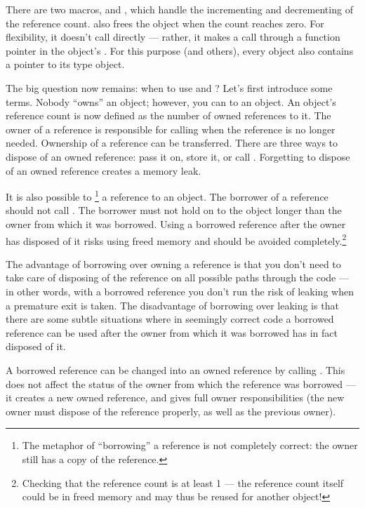 There are two macros,  and ,
which handle the incrementing and decrementing of the reference count.
 also frees the object when the count reaches zero.
For flexibility, it doesn't call  directly --- rather, it
makes a call through a function pointer in the object's .  For this purpose (and others), every object also contains a
pointer to its type object.

The big question now remains: when to use  and
?  Let's first introduce some terms.  Nobody
``owns'' an object; however, you can  to an
object.  An object's reference count is now defined as the number of
owned references to it.  The owner of a reference is responsible for
calling  when the reference is no longer
needed.  Ownership of a reference can be transferred.  There are three
ways to dispose of an owned reference: pass it on, store it, or call
.  Forgetting to dispose of an owned reference
creates a memory leak.

It is also possible to \footnote{The metaphor of
``borrowing'' a reference is not completely correct: the owner still
has a copy of the reference.} a reference to an object.  The borrower
of a reference should not call .  The borrower must
not hold on to the object longer than the owner from which it was
borrowed.  Using a borrowed reference after the owner has disposed of
it risks using freed memory and should be avoided
completely.\footnote{Checking that the reference count is at least 1
 --- the reference count itself could be in
freed memory and may thus be reused for another object!}

The advantage of borrowing over owning a reference is that you don't
need to take care of disposing of the reference on all possible paths
through the code --- in other words, with a borrowed reference you
don't run the risk of leaking when a premature exit is taken.  The
disadvantage of borrowing over leaking is that there are some subtle
situations where in seemingly correct code a borrowed reference can be
used after the owner from which it was borrowed has in fact disposed
of it.

A borrowed reference can be changed into an owned reference by calling
.  This does not affect the status of the owner from
which the reference was borrowed --- it creates a new owned reference,
and gives full owner responsibilities (the new owner must
dispose of the reference properly, as well as the previous owner).


